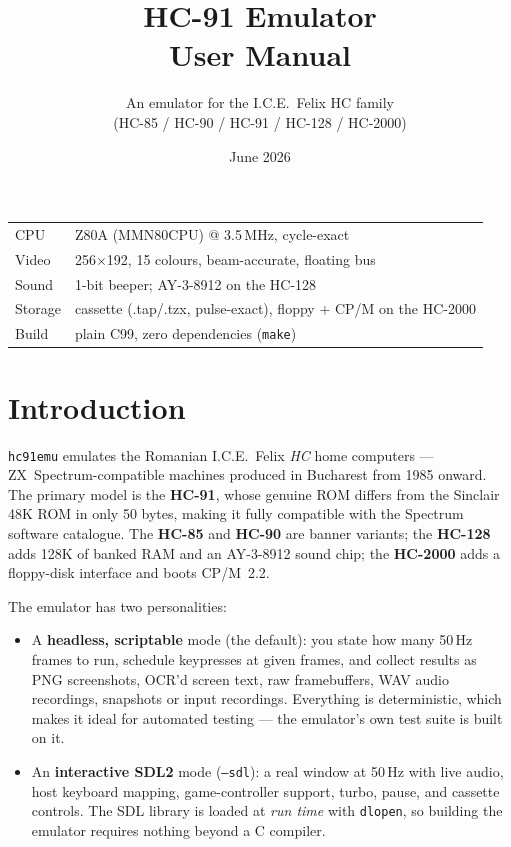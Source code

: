 \documentclass[11pt,a4paper]{article}
\title{\Huge HC-91 Emulator\\[0.6ex]\LARGE User Manual}
\author{An emulator for the I.C.E.~Felix HC family\\
        (HC-85 / HC-90 / HC-91 / HC-128 / HC-2000)}
\date{June 2026}
\newcommand{\opt}[1]{\texttt{#1}}
\begin{document}
\maketitle
\thispagestyle{empty}

\begin{center}
\begin{tabular}{ll}
\toprule
CPU & Z80A (MMN80CPU) @ 3.5\,MHz, cycle-exact \\
Video & 256$\times$192, 15 colours, beam-accurate, floating bus \\
Sound & 1-bit beeper; AY-3-8912 on the HC-128 \\
Storage & cassette (.tap/.tzx, pulse-exact), floppy + CP/M on the HC-2000 \\
Build & plain C99, zero dependencies (\texttt{make}) \\
\bottomrule
\end{tabular}
\end{center}

\vspace{1em}
\tableofcontents
\clearpage

\section{Introduction}

\texttt{hc91emu} emulates the Romanian I.C.E.~Felix \emph{HC} home
computers --- ZX~Spectrum-compatible machines produced in Bucharest
from 1985 onward. The primary model is the \textbf{HC-91}, whose
genuine ROM differs from the Sinclair 48K ROM in only 50 bytes, making
it fully compatible with the Spectrum software catalogue. The
\textbf{HC-85} and \textbf{HC-90} are banner variants; the
\textbf{HC-128} adds 128K of banked RAM and an AY-3-8912 sound chip;
the \textbf{HC-2000} adds a floppy-disk interface and boots CP/M~2.2.

The emulator has two personalities:

\begin{itemize}
\item A \textbf{headless, scriptable} mode (the default): you state how
many 50\,Hz frames to run, schedule keypresses at given frames, and
collect results as PNG screenshots, OCR'd screen text, raw
framebuffers, WAV audio recordings, snapshots or input recordings.
Everything is deterministic, which makes it ideal for automated
testing --- the emulator's own test suite is built on it.
\item An \textbf{interactive SDL2} mode (\opt{--sdl}): a real window at
50\,Hz with live audio, host keyboard mapping, game-controller
support, turbo, pause, and cassette controls. The SDL library is
loaded at \emph{run time} with \texttt{dlopen}, so building the
emulator requires nothing beyond a C compiler.
\end{itemize}
\end{document}
